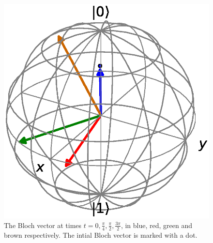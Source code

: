 \documentclass[letter]{article}
\begin{document}
\begin{figure}
  \centering
  \includegraphics{bloch.eps}
  \caption{The Bloch vector at times $t=0, \frac{\pi}{4}, \frac{\pi}{2}, \frac{3\pi}{2}$, in blue, red, green and brown respectively. The intial Bloch vector is marked with a dot.}
  \label{fig:blochvector}
\end{figure}
\end{document}
